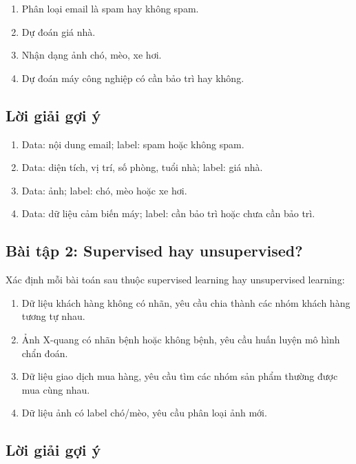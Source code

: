 \begin{enumerate}
    \item Phân loại email là spam hay không spam.
    \item Dự đoán giá nhà.
    \item Nhận dạng ảnh chó, mèo, xe hơi.
    \item Dự đoán máy công nghiệp có cần bảo trì hay không.
\end{enumerate}

\subsection*{Lời giải gợi ý}

\begin{enumerate}
    \item Data: nội dung email; label: spam hoặc không spam.
    \item Data: diện tích, vị trí, số phòng, tuổi nhà; label: giá nhà.
    \item Data: ảnh; label: chó, mèo hoặc xe hơi.
    \item Data: dữ liệu cảm biến máy; label: cần bảo trì hoặc chưa cần bảo trì.
\end{enumerate}

\subsection*{Bài tập 2: Supervised hay unsupervised?}

Xác định mỗi bài toán sau thuộc supervised learning hay unsupervised learning:

\begin{enumerate}
    \item Dữ liệu khách hàng không có nhãn, yêu cầu chia thành các nhóm khách hàng tương tự nhau.
    \item Ảnh X-quang có nhãn bệnh hoặc không bệnh, yêu cầu huấn luyện mô hình chẩn đoán.
    \item Dữ liệu giao dịch mua hàng, yêu cầu tìm các nhóm sản phẩm thường được mua cùng nhau.
    \item Dữ liệu ảnh có label chó/mèo, yêu cầu phân loại ảnh mới.
\end{enumerate}

\subsection*{Lời giải gợi ý}

